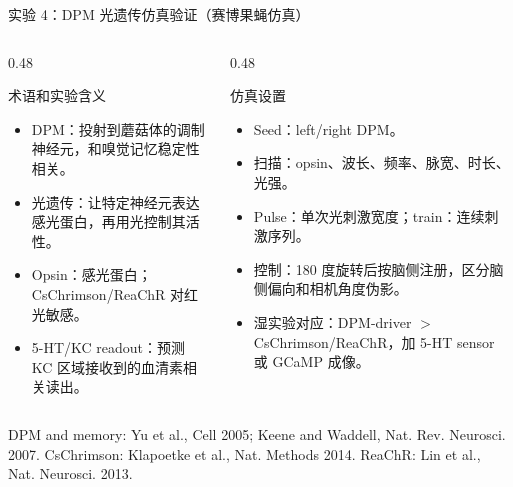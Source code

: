 \documentclass[aspectratio=169,10pt,fontset=none]{ctexbeamer}
\newcommand{\refs}[1]{\vfill{\tiny\textcolor{FlyDark}{#1}}}
\begin{document}
\begin{frame}{实验 4：DPM 光遗传仿真验证（赛博果蝇仿真）}
\small
\begin{columns}[T,onlytextwidth]
  \begin{column}{0.48\textwidth}
    \begin{block}{术语和实验含义}
      \begin{itemize}
        \item DPM：投射到蘑菇体的调制神经元，和嗅觉记忆稳定性相关。
        \item 光遗传：让特定神经元表达感光蛋白，再用光控制其活性。
        \item Opsin：感光蛋白；CsChrimson/ReaChR 对红光敏感。
        \item 5-HT/KC readout：预测 KC 区域接收到的血清素相关读出。
      \end{itemize}
    \end{block}
  \end{column}
  \begin{column}{0.48\textwidth}
    \begin{block}{仿真设置}
      \begin{itemize}
        \item Seed：left/right DPM。
        \item 扫描：opsin、波长、频率、脉宽、时长、光强。
        \item Pulse：单次光刺激宽度；train：连续刺激序列。
        \item 控制：180 度旋转后按脑侧注册，区分脑侧偏向和相机角度伪影。
        \item 湿实验对应：DPM-driver $>$ CsChrimson/ReaChR，加 5-HT sensor 或 GCaMP 成像。
      \end{itemize}
    \end{block}
  \end{column}
\end{columns}
\refs{DPM and memory: Yu et al., Cell 2005; Keene and Waddell, Nat. Rev. Neurosci. 2007. CsChrimson: Klapoetke et al., Nat. Methods 2014. ReaChR: Lin et al., Nat. Neurosci. 2013.}
\end{frame}
\end{document}
